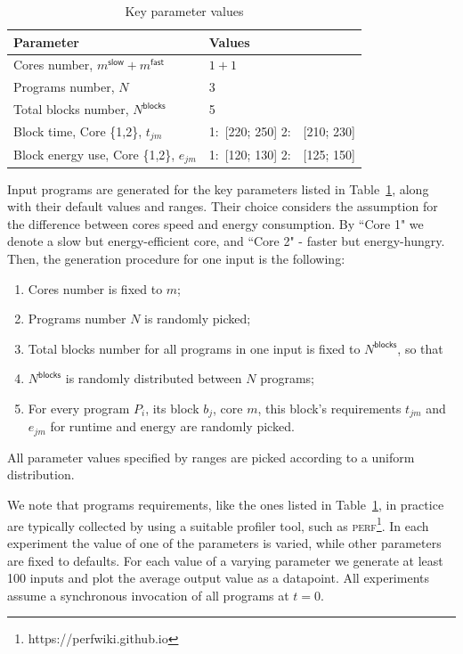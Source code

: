 \begin{table}
\captionsetup{justification=centering}
\caption{Key parameter values}
\centering
\begin{tabular}{l|p{28mm}} 
 \hline
 Parameter &  Values\\[1pt]
 \hline
Cores number, $m^{\mathsf{slow}} + m^{\mathsf{fast}}$ & $1+1$ \\[4pt]
Programs number, $N$ & 3 \\[4pt]
Total blocks number, $N^{\mathsf{blocks}}$ & 5 \\[6pt]
Block time, Core \{1,2\}, $t_{jm}$ & 1:\ [220; 250] 2:\ \ [210; 230]  \\[15pt]
Block energy use, Core \{1,2\}, $e_{jm}$ & 1:\ [120; 130] 2:\ \  [125; 150] \\
 \hline
\end{tabular}
\label{tab:defaultSettings}
\vspace{-5mm}
\end{table}


Input programs are generated for the key parameters listed in Table~\ref{tab:defaultSettings}, along with their default values and ranges. Their choice considers the assumption for the difference between cores speed and energy consumption. By ``Core 1" we denote a slow but energy-efficient core, and ``Core 2" \-- faster but energy-hungry. Then, the generation procedure for one input is the following:
%
\begin{enumerate}
\item Cores number is fixed to $m$;
\item Programs number $N$ is randomly picked;
\item Total blocks number for all programs in one input is fixed to $N^{\mathsf{blocks}}$, so that
\item $N^{\mathsf{blocks}}$ is randomly distributed between $N$ programs;
\item For every program $P_i$, its block $b_j$, core $m$, this block's requirements $t_{jm}$ and $e_{jm}$ for runtime and energy are randomly picked.
\end{enumerate}
%
All parameter values specified by ranges are picked according to a uniform distribution.

We note that programs requirements, like the ones listed in Table~\ref{tab:defaultSettings}, in practice are typically collected by using a suitable profiler tool, such as \textsc{perf}\footnote{https://perfwiki.github.io}. In each experiment the value of one of the parameters is varied, while other parameters are fixed to defaults. For each value of a varying parameter we generate at least 100 inputs and plot the average output value as a datapoint. All experiments assume a synchronous invocation of all programs at $t=0$.



